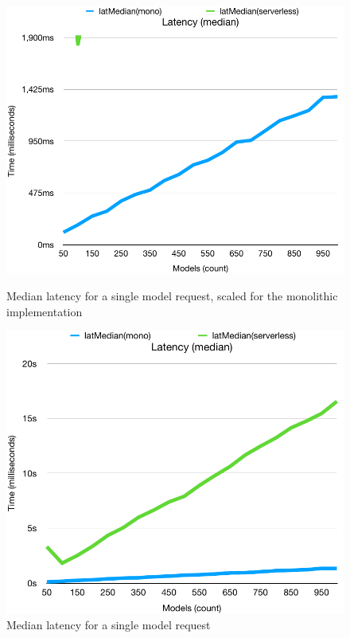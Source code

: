 \begin{figure}[h!]
    \centering
    \begin{minipage}{0.48\textwidth}
        \centering
        \includegraphics[width=\linewidth]{media/no_rl_mono_lat_med.pdf}
        \caption{Median latency for a single model request, scaled for the monolithic implementation}
        \label{fig:rate_unlimited_comparison_lat_mono}
    \end{minipage}\hfill
    \begin{minipage}{0.48\textwidth}
        \centering
        \includegraphics[width=\linewidth]{media/no_rl_lat_med.pdf}
        \caption{Median latency for a single model request}
        \label{fig:rate_unlimited_comparison_lat}
    \end{minipage}
\end{figure}

